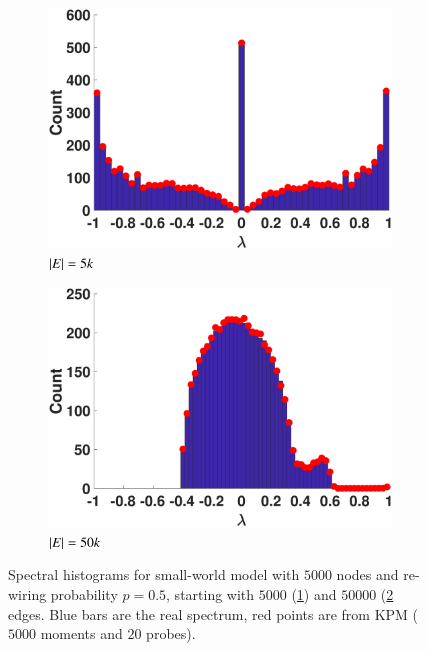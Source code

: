 \begin{figure}[ht]
  \begin{subfigure}{0.47\textwidth}
    \centering  
    \captionsetup{justification=centering}
    \includegraphics[width=\textwidth,trim = .4cm 0.5cm 3.5cm 1.3cm,clip]
    {./ndos/pics/sw_sparse}
    \caption{$\left\lvert E\right\rvert=5k$}\label{fig:sw_sparse}
  \end{subfigure}
  \begin{subfigure}{0.47\textwidth}
    \centering
    \captionsetup{justification=centering}
    \includegraphics[width=\textwidth,trim = .4cm 0.5cm 3.5cm 1.3cm,clip]
    {./ndos/pics/sw_dense}
    \caption{$\left\lvert E\right\rvert=50k$}\label{fig:sw_dense}
  \end{subfigure}
  \caption{Spectral histograms for small-world model with $5000$ nodes and
  re-wiring probability $p=0.5$, starting with $5000$ (\ref{fig:sw_sparse}) and
  $50000$ (\ref{fig:sw_dense} edges. Blue bars are the real spectrum, red points
  are from KPM ($5000$ moments and $20$ probes).} \label{fig:sw}
\end{figure}


